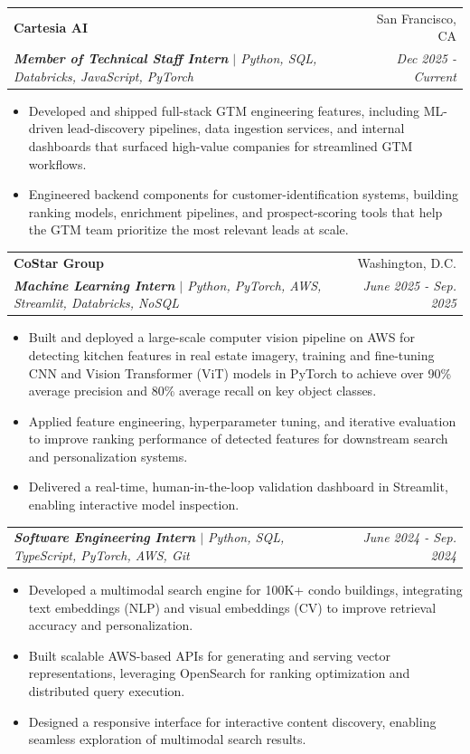 \documentclass[letterpaper,11pt]{article}
\makeatletter
\newcommand{\resumeItem}[1]{
  \item\small{
    {#1 \vspace{-2pt}}
  }
}
\newcommand{\resumeSubheading}[4]{
  \vspace{-2pt}\item
    \begin{tabular*}{0.97\textwidth}[t]{l@{\extracolsep{\fill}}r}
      \textbf{#1} & #2 \\
      \textit{\small#3} & \textit{\small #4} \\
    \end{tabular*}\vspace{-7pt}
}
\newcommand{\resumeSubSubheading}[2]{
    \item
    \begin{tabular*}{0.97\textwidth}{l@{\extracolsep{\fill}}r}
      \textit{\small#1} & \textit{\small #2} \\
    \end{tabular*}\vspace{-7pt}
}
\newcommand{\resumeItemListStart}{\begin{itemize}}
\newcommand{\resumeItemListEnd}{\end{itemize}\vspace{-5pt}}
\makeatother
\begin{document}
      \resumeSubheading
      {Cartesia AI}{San Francisco, CA}
      {\textbf{Member of Technical Staff Intern} $|$ Python, SQL, Databricks, JavaScript, PyTorch}{Dec 2025 - Current}
      \resumeItemListStart
        \resumeItem{Developed and shipped full-stack GTM engineering features, including ML-driven lead-discovery pipelines, data ingestion services, and internal dashboards that surfaced high-value companies for streamlined GTM workflows.}
        \resumeItem{Engineered backend components for customer-identification systems, building ranking models, enrichment pipelines, and prospect-scoring tools that help the GTM team prioritize the most relevant leads at scale.}
      \resumeItemListEnd
    \resumeSubheading
      {CoStar Group}{Washington, D.C.}
      {\textbf{Machine Learning Intern} $|$ Python, PyTorch, AWS, Streamlit, Databricks, NoSQL}{June 2025 - Sep. 2025}
      \resumeItemListStart
        \resumeItem{Built and deployed a large-scale computer vision pipeline on AWS for detecting kitchen features in real estate imagery, training and fine-tuning CNN and Vision Transformer (ViT) models in PyTorch to achieve over 90\% average precision and 80\% average recall on key object classes.}
        \resumeItem{Applied feature engineering, hyperparameter tuning, and iterative evaluation to improve ranking performance of detected features for downstream search and personalization systems.}
        \resumeItem{Delivered a real-time, human-in-the-loop validation dashboard in Streamlit, enabling interactive model inspection.}
      \resumeItemListEnd
    \resumeSubSubheading
     {\textbf{Software Engineering Intern} $|$ Python, SQL, TypeScript, PyTorch, AWS, Git}{June 2024 - Sep. 2024}
     \resumeItemListStart
        \resumeItem{Developed a multimodal search engine for 100K+ condo buildings, integrating text embeddings (NLP) and visual embeddings (CV) to improve retrieval accuracy and personalization.}
        \resumeItem{Built scalable AWS-based APIs for generating and serving vector representations, leveraging OpenSearch for ranking optimization and distributed query execution.}
        \resumeItem{Designed a responsive interface for interactive content discovery, enabling seamless exploration of multimodal search results.}
     \resumeItemListEnd
\end{document}
